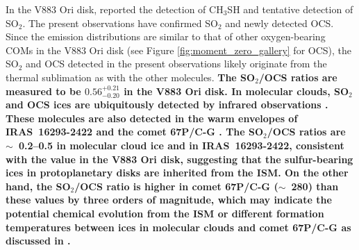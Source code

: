 \documentclass[twocolumn, twocolappendix, astrosymb, times]{aastex631}
\begin{document}
In the V883 Ori disk, \citet{Lee2019} reported the detection of CH$_3$SH and tentative detection of SO$_2$. The present observations have confirmed SO$_2$ and newly detected OCS.
Since the emission distributions are similar to that of other oxygen-bearing COMs in the V883 Ori disk (see Figure \ref{fig:moment_zero_gallery} for OCS), the SO$_2$ and OCS detected in the present observations likely originate from the thermal sublimation as with the other molecules. \textbf{The SO$_2$/OCS ratios are measured to be $0.56_{-0.20}^{+0.21}$ in the V883 Ori disk. In molecular clouds, SO$_2$ and OCS ices are ubiquitously detected by infrared observations \citep[e.g.,][]{Boogert2015, McClure2023}. These molecules are also detected in the warm envelopes of IRAS~16293-2422 \citep{Drozdovskaya2018} and the comet 67P/C-G \citep{Calmonte2016}. The SO$_2$/OCS ratios are $\sim$~0.2--0.5 in molecular cloud ice and in IRAS~16293-2422, consistent with the value in the V883 Ori disk, suggesting that the sulfur-bearing ices in protoplanetary disks are inherited from the ISM. On the other hand, the SO$_2$/OCS ratio is higher in comet 67P/C-G ($\sim$~280) than these values by three orders of magnitude, which may indicate the potential chemical evolution from the ISM or different formation temperatures between ices in molecular clouds and comet 67P/C-G as discussed in \citet{Drozdovskaya2018}.}



\end{document}
